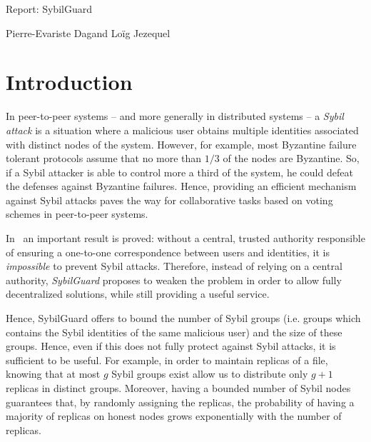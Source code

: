 \documentclass[a4paper,11pt]{article}
\begin{document}
\begin{center}
  {\Large Report: SybilGuard}
\end{center}
\begin{center}
  {\large Pierre-Evariste {\sc Dagand} \qquad Loïg {\sc Jezequel}}
\end{center}


\section*{Introduction}


In peer-to-peer systems -- and more generally in distributed systems
-- a \emph{Sybil attack} is a situation where a malicious user obtains
multiple identities associated with distinct nodes of the system.
However, for example, most Byzantine failure tolerant protocols assume
that no more than $1/3$ of the nodes are Byzantine.  So, if a Sybil
attacker is able to control more a third of the system, he could
defeat the defenses against Byzantine failures.  Hence, providing an
efficient mechanism against Sybil attacks paves the way for
collaborative tasks based on voting schemes in peer-to-peer systems.


In~\cite{douceur} an important result is proved: without a central,
trusted authority responsible of ensuring a one-to-one correspondence
between users and identities, it is \emph{impossible} to prevent Sybil
attacks. Therefore, instead of relying on a central authority,
\emph{SybilGuard} proposes to weaken the problem in order to allow
fully decentralized solutions, while still providing a useful service.


Hence, SybilGuard offers to bound the number of Sybil groups
(i.e. groups which contains the Sybil identities of the same malicious
user) and the size of these groups.  Hence, even if this does not
fully protect against Sybil attacks, it is sufficient to be useful.
For example, in order to maintain replicas of a file, knowing that at
most $g$ Sybil groups exist allow us to distribute only $g+1$ replicas
in distinct groups.  Moreover, having a bounded number of Sybil nodes
guarantees that, by randomly assigning the replicas, the probability of
having a majority of replicas on honest nodes grows exponentially with
the number of replicas.
\end{document}
